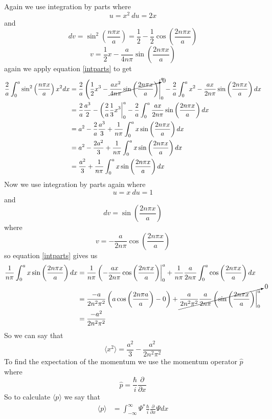 \documentclass[11pt]{article}
\numberwithin{equation}{section}
\newcommand{\expt}[1]{\langle{#1}\rangle}
\begin{document}
\begin{enumerate}[(a)]
Again we use integration by parts where
$$u = x^2\ du = 2x$$
and
$$dv = \sin^2\left(\frac{n\pi x}{a}\right) = \frac{1}{2} - \frac{1}{2}\cos\left(\frac{2n\pi x}{a}\right)$$
$$v = \frac{1}{2}x - \frac{a}{4n\pi}\sin\left(\frac{2n\pi x}{a}\right)$$
again we apply equation \ref{intparts} to get
\begin{align*}
{\frac{2}{a}}\int_{0}^{a}\sin^2\left(\frac{n\pi x}{a}\right)x^2dx &= \frac{2}{a}\left(\frac{1}{2}x^3 - \cancelto{0}{\frac{ax^2}{4n\pi}\sin\left(\frac{2n\pi x}{a}\right)}\right|_0^a - \frac{2}{a}\int_{0}^{a} x^2 - \frac{ax}{2n\pi}\sin\left(\frac{2n\pi x}{a}\right) dx\\
&= \frac{2}{a}\frac{a^3}{2} - \left(\frac{2}{a}\frac{1}{3}x^3\right|_0^a - \frac{2}{a}\int_0^a\frac{ax}{2n\pi}\sin\left(\frac{2n\pi x}{a}\right)dx\\
&= a^2 - \frac{2}{a}\frac{a^3}{3} + \frac{1}{n\pi}\int_0^a x\sin\left(\frac{2n\pi x}{a}\right)dx\\
&= a^2 - \frac{2a^2}{3} + \frac{1}{n\pi}\int_0^a x\sin\left(\frac{2n\pi x}{a}\right)dx\\
&= \frac{a^2}{3} + \frac{1}{n\pi}\int_0^a x\sin\left(\frac{2n\pi x}{a}\right)dx
\end{align*}
Now we use integration by parts again where
$$u = x\ du = 1$$
and 
$$dv = \sin\left(\frac{2n\pi x}{a}\right)$$
where
$$v = -\frac{a}{2n\pi}\cos\left(\frac{2n\pi x}{a}\right)$$
so equation \ref{intparts} gives us
\begin{align*}
\frac{1}{n\pi}\int_0^a x\sin\left(\frac{2n\pi x}{a}\right)dx &= \frac{1}{n\pi}\left(-\frac{ax}{2n\pi}\cos\left(\frac{2n\pi x}{a}\right)\right|_0^a + \frac{1}{n\pi}\frac{a}{2n\pi}\int_0^a \cos\left(\frac{2n\pi x}{a}\right)dx\\
&= \frac{-a}{2n^2\pi^2}\left(a\cos\left(\frac{2n\pi a}{a}\right) - 0\right) + \cancelto{0}{\frac{a}{2n^2\pi^2}\frac{a}{2n\pi}\left(\sin\left(\frac{2n\pi x}{a}\right)\right|_0^a}\\
&= \frac{-a^2}{2n^2\pi^2}
\end{align*}
So we can say that
$$\langle x^2\rangle = \frac{a^2}{3} - \frac{a^2}{2n^2\pi^2}$$
To find the expectation of the momentum we use the momentum operator $\hat{p}$ where
\begin{equation}
\hat{p} = \frac{\hbar}{i}\frac{\partial}{\partial x}
\label{momop}
\end{equation}
So to calculate $\expt{p}$ we say that
\begin{align*}
\expt{p} &= \int_{-\infty}^{\infty}\Psi^*\frac{\hbar}{i}\frac{\partial}{\partial x}\Psi dx\\

\end{align*}
\end{enumerate}
\end{document}
